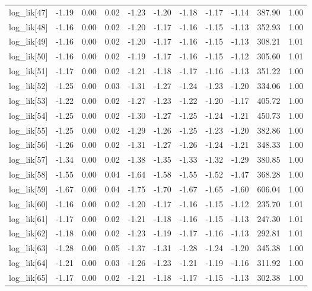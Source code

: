 \begin{table}[ht]
\begin{tabular}{rrrrrrrrrrr}
  log\_lik[47] & -1.19 & 0.00 & 0.02 & -1.23 & -1.20 & -1.18 & -1.17 & -1.14 & 387.90 & 1.00 \\ 
  log\_lik[48] & -1.16 & 0.00 & 0.02 & -1.20 & -1.17 & -1.16 & -1.15 & -1.13 & 352.93 & 1.00 \\ 
  log\_lik[49] & -1.16 & 0.00 & 0.02 & -1.20 & -1.17 & -1.16 & -1.15 & -1.13 & 308.21 & 1.01 \\ 
  log\_lik[50] & -1.16 & 0.00 & 0.02 & -1.19 & -1.17 & -1.16 & -1.15 & -1.12 & 305.60 & 1.01 \\ 
  log\_lik[51] & -1.17 & 0.00 & 0.02 & -1.21 & -1.18 & -1.17 & -1.16 & -1.13 & 351.22 & 1.00 \\ 
  log\_lik[52] & -1.25 & 0.00 & 0.03 & -1.31 & -1.27 & -1.24 & -1.23 & -1.20 & 334.06 & 1.00 \\ 
  log\_lik[53] & -1.22 & 0.00 & 0.02 & -1.27 & -1.23 & -1.22 & -1.20 & -1.17 & 405.72 & 1.00 \\ 
  log\_lik[54] & -1.25 & 0.00 & 0.02 & -1.30 & -1.27 & -1.25 & -1.24 & -1.21 & 450.73 & 1.00 \\ 
  log\_lik[55] & -1.25 & 0.00 & 0.02 & -1.29 & -1.26 & -1.25 & -1.23 & -1.20 & 382.86 & 1.00 \\ 
  log\_lik[56] & -1.26 & 0.00 & 0.02 & -1.31 & -1.27 & -1.26 & -1.24 & -1.21 & 348.33 & 1.00 \\ 
  log\_lik[57] & -1.34 & 0.00 & 0.02 & -1.38 & -1.35 & -1.33 & -1.32 & -1.29 & 380.85 & 1.00 \\ 
  log\_lik[58] & -1.55 & 0.00 & 0.04 & -1.64 & -1.58 & -1.55 & -1.52 & -1.47 & 368.28 & 1.00 \\ 
  log\_lik[59] & -1.67 & 0.00 & 0.04 & -1.75 & -1.70 & -1.67 & -1.65 & -1.60 & 606.04 & 1.00 \\ 
  log\_lik[60] & -1.16 & 0.00 & 0.02 & -1.20 & -1.17 & -1.16 & -1.15 & -1.12 & 235.70 & 1.01 \\ 
  log\_lik[61] & -1.17 & 0.00 & 0.02 & -1.21 & -1.18 & -1.16 & -1.15 & -1.13 & 247.30 & 1.01 \\ 
  log\_lik[62] & -1.18 & 0.00 & 0.02 & -1.23 & -1.19 & -1.17 & -1.16 & -1.13 & 292.81 & 1.01 \\ 
  log\_lik[63] & -1.28 & 0.00 & 0.05 & -1.37 & -1.31 & -1.28 & -1.24 & -1.20 & 345.38 & 1.00 \\ 
  log\_lik[64] & -1.21 & 0.00 & 0.03 & -1.26 & -1.23 & -1.21 & -1.19 & -1.16 & 311.92 & 1.00 \\ 
  log\_lik[65] & -1.17 & 0.00 & 0.02 & -1.21 & -1.18 & -1.17 & -1.15 & -1.13 & 302.38 & 1.00 \\ 

\end{tabular}
\end{table}
